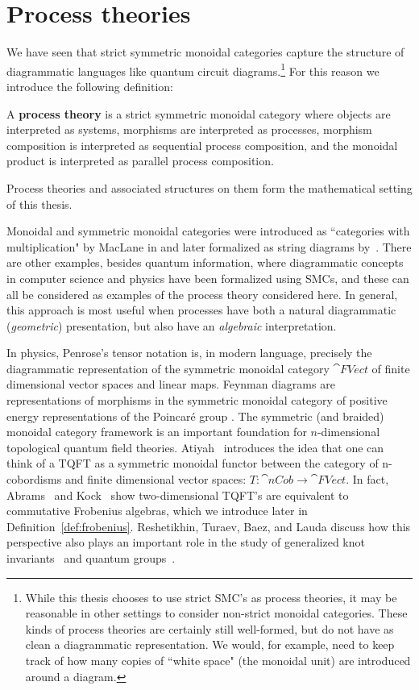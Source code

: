 \section{Process theories}
\label{sec:PTs}

We have seen that strict symmetric monoidal categories capture the structure of  diagrammatic languages like quantum circuit diagrams.\footnote{While this thesis chooses to use strict SMC's as process theories, it may be reasonable in other settings to consider non-strict monoidal categories.  These kinds of process theories are certainly still well-formed, but do not have as clean a diagrammatic representation.  We would, for example, need to keep track of how many copies of ``white space" (the monoidal unit) are introduced around a diagram.} For this reason we introduce the following definition:

\begin{defn}
A \textbf{process theory} is a strict symmetric monoidal category where objects are interpreted as systems, morphisms are interpreted as processes, morphism composition is interpreted as sequential process composition, and the monoidal product is interpreted as parallel process composition.
\end{defn}

\noindent Process theories and associated structures on them form the mathematical setting of this thesis.

Monoidal and symmetric monoidal categories were introduced as ``categories with multiplication" by MacLane in \cite{maclane1963natural} and later formalized as string diagrams by~\cite{joyal1991geometry}. There are other examples, besides quantum information, where diagrammatic concepts in computer science and physics have been formalized using SMCs, and these can all be considered as examples of the process theory considered here.  In general, this approach is most useful when processes have both a natural diagrammatic (\emph{geometric}) presentation, but also have an \emph{algebraic} interpretation.

In physics, Penrose's tensor notation \cite{penrose1971applications} is, in modern language, precisely the diagrammatic representation of the symmetric monoidal category $\cat{FVect}$ of finite dimensional vector spaces and linear maps. Feynman diagrams are representations of morphisms in the symmetric monoidal category of positive energy representations of the Poincar\'{e} group \cite{baez2009prehistory}. The symmetric (and braided) monoidal category framework is an important foundation for $n$-dimensional topological quantum field theories. Atiyah~\cite{atiyah1988topological} introduces the idea that one can think of a TQFT as a symmetric monoidal functor between the category of n-cobordisms and finite dimensional vector spaces: $T:\cat{nCob}\to \cat{FVect}$. In fact, Abrams~\cite{abrams1996two} and Kock~\cite{kock2004frobenius} show two-dimensional TQFT's are equivalent to commutative Frobenius algebras, which we introduce later in Definition~\ref{def:frobenius}. Reshetikhin, Turaev, Baez, and Lauda discuss how this perspective also plays an important role in the study of generalized knot invariants~\cite{reshetikhin1990ribbon} and quantum groups~\cite{baez2009prehistory}. 

